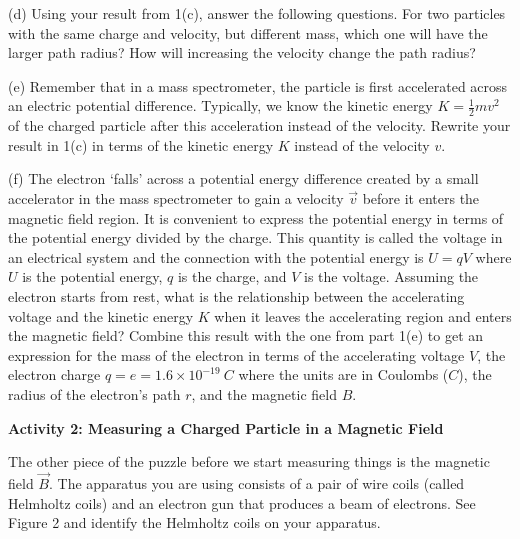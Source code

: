 (d) Using your result from 1(c), answer the following questions.
For two particles with the same charge and velocity, but different mass, which one will have the larger path radius?
How will increasing the velocity change the path radius?
\vspace{30mm}

(e) Remember that in a mass spectrometer, the particle is first accelerated
across an electric potential difference.
Typically, we know the kinetic energy $K=\frac{1}{2}mv^2$ of the charged particle after this
acceleration instead of the velocity.
Rewrite your result in 1(c) in terms of the kinetic energy $K$ instead of the
velocity $v$.
\vspace{45mm}

(f) The electron `falls' across a potential energy difference created by a small accelerator in the mass spectrometer
to gain a velocity $\vec v$ before it enters the magnetic field region.
It is convenient to express  the potential energy in terms of the potential energy divided by the charge.
This quantity is called the voltage in an electrical system and the connection with the potential energy
is $U=qV$ where $U$ is the potential energy, $q$ is the charge, and $V$ is the voltage.
Assuming the electron starts from rest, what is the relationship between the accelerating
voltage and the kinetic energy $K$ when it leaves the accelerating region and
enters the magnetic field? 
Combine this result with the one from part 1(e) to get an expression for 
the mass of the electron in terms of the accelerating voltage $V$, the
electron charge $q=e=1.6\times 10^{-19}~C$ where the units are in Coulombs ($C$), the radius of the electron's path $r$, and 
the magnetic field $B$.
\vspace{45mm}


\textbf{Activity 2: Measuring a Charged Particle in a Magnetic Field}

The other piece of the puzzle before we start measuring things is the magnetic field
$\vec B$.
The apparatus you are using consists of a pair of wire coils (called Helmholtz coils) and
an electron gun that produces a beam of electrons.
See Figure 2 and identify the Helmholtz coils on your apparatus.

